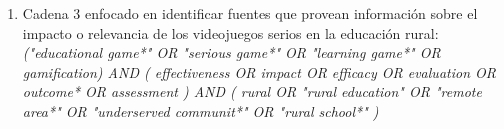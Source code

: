 \begin{enumerate}
    \item Cadena 3 enfocado en identificar fuentes que provean información sobre el impacto o relevancia de los videojuegos serios en la educación rural: \textit{("educational game*" OR "serious game*" OR "learning game*" OR gamification) AND ( effectiveness OR impact OR efficacy OR evaluation OR outcome* OR assessment ) AND ( rural OR "rural education" OR "remote area*" OR "underserved communit*" OR "rural school*" )}

\end{enumerate}

